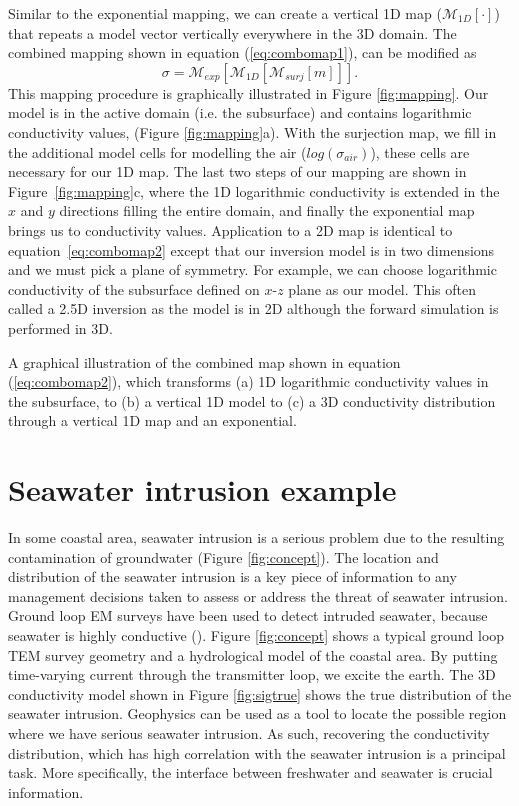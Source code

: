 \documentclass{segabs}
\begin{document}
Similar to the exponential mapping, we can create a vertical 1D map ($\mathcal{M}_{1D}[\cdot]$) that repeats a model vector vertically everywhere in the 3D domain. The combined mapping shown in equation (\ref{eq:combomap1}), can be modified as
\begin{equation}
  \sigma = \mathcal{M}_{exp}[\mathcal{M}_{1D}[\mathcal{M}_{surj}[m]]].
  \label{eq:combomap2}
\end{equation}
This mapping procedure is graphically illustrated in Figure \ref{fig:mapping}. Our model is in the active domain (i.e. the subsurface) and contains logarithmic conductivity values, (Figure \ref{fig:mapping}a). With the surjection map, we fill in the additional model cells for modelling the air ($log(\sigma_{air})$), these cells are necessary for our 1D map. The last two steps of our mapping are shown in Figure~\ref{fig:mapping}c, where the 1D logarithmic conductivity is extended in the $x$ and $y$ directions filling the entire domain, and finally the exponential map brings us to conductivity values. 
Application to a 2D map is identical to equation~\ref{eq:combomap2} except that our inversion model is in two dimensions and we must pick a plane of symmetry. For example, we can choose logarithmic conductivity of the subsurface defined on $x$-$z$ plane as our model. This often called a 2.5D inversion as the model is in 2D although the forward simulation is performed in 3D.

{A graphical illustration of the combined map shown in equation (\ref{eq:combomap2}), which transforms (a) 1D logarithmic conductivity values in the subsurface, to (b) a vertical 1D model to (c) a 3D conductivity distribution through a vertical 1D map and an exponential.}

\section*{Seawater intrusion example}
In some coastal area, seawater intrusion is a serious problem due to the resulting contamination of groundwater (Figure \ref{fig:concept}). The location and distribution of the seawater intrusion is a key piece of information to any management decisions taken to assess or address the threat of seawater intrusion. Ground loop EM surveys have been used to detect intruded seawater, because seawater is highly conductive (\cite{Mills1988}). Figure \ref{fig:concept} shows a typical ground loop TEM survey geometry and a hydrological model of the coastal area. By putting time-varying current through the transmitter loop, we excite the earth. The 3D conductivity model shown in Figure \ref{fig:sigtrue} shows the true distribution of the seawater intrusion. Geophysics can be used as a tool to locate the possible region where we have serious seawater intrusion. As such, recovering the conductivity distribution, which has high correlation with the seawater intrusion is a principal task. More specifically, the interface between freshwater and seawater is crucial information.
\end{document}
